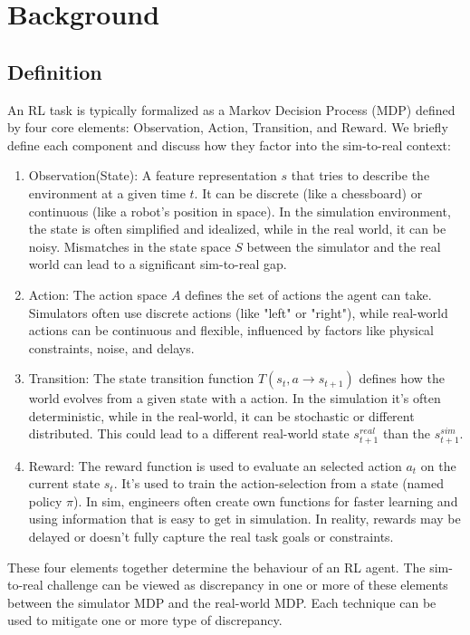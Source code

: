 \section{Background}
\subsection{Definition}
An RL task is typically formalized as a Markov Decision Process (MDP) defined by four core elements: Observation, Action, Transition, and Reward. We briefly define each component and discuss how they factor into the sim-to-real context:
\begin{enumerate}
    \item Observation(State): A feature representation $s$ that tries to describe the environment at a given time $t$. It can be discrete (like a chessboard) or continuous (like a robot's position in space). In the simulation environment, the state is often simplified and idealized, while in the real world, it can be noisy. Mismatches in the state space $S$ between the simulator and the real world can lead to a significant sim-to-real gap.
    \item Action: The action space $A$ defines the set of actions the agent can take. Simulators often use discrete actions (like "left" or "right"), while real-world actions can be continuous and flexible, influenced by factors like physical constraints, noise, and delays.
    \item Transition: The state transition function $T(s_t,a \to s_{t+1})$ defines how the world evolves from a given state with a action. In the simulation it's often deterministic, while in the real-world, it can be stochastic or different distributed. This could lead to a different real-world state $s_{t+1}^{real}$ than the $s_{t+1}^{sim}$.
    \item Reward: The reward function is used to evaluate an selected action $a_t$ on the current state $s_t$. It's used to train the action-selection from a state (named policy $\pi$). In sim, engineers often create own functions for faster learning and using information that is easy to get in simulation. In reality, rewards may be delayed or doesn't fully capture the real task goals or constraints.
\end{enumerate}

These four elements together determine the behaviour of an RL agent. The sim-to-real challenge can be viewed as discrepancy in one or more of these elements between the simulator MDP and the real-world MDP. Each technique can be used to mitigate one or more type of discrepancy.